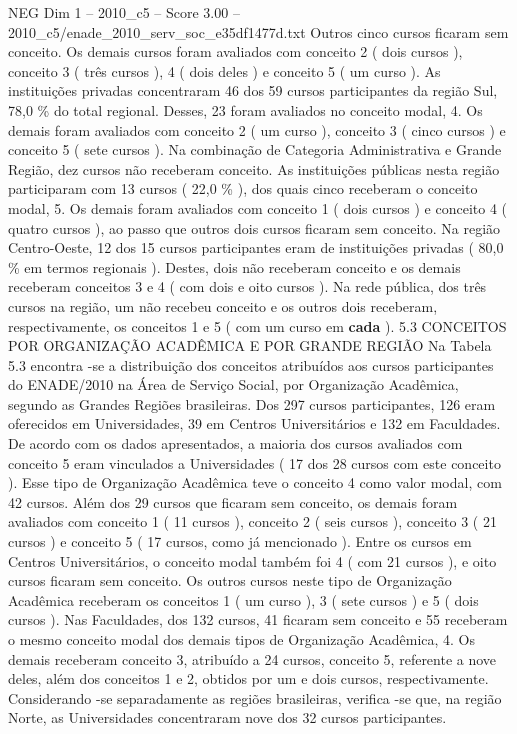 \begin{textsample}{NEG Dim 1 – 2010\_c5 – Score 3.00 – 2010\_c5/enade\_2010\_serv\_soc\_e35df1477d.txt}
Outros cinco cursos ficaram sem conceito.
Os demais cursos foram avaliados com conceito 2 ( dois cursos ), conceito 3 ( três cursos ), 4 ( dois deles ) e conceito 5 ( um curso ).
As instituições privadas concentraram 46 dos 59 cursos participantes da região Sul, 78,0 \% do total regional.
Desses, 23 foram avaliados no conceito modal, 4.
Os demais foram avaliados com conceito 2 ( um curso ), conceito 3 ( cinco cursos ) e conceito 5 ( sete cursos ).
Na combinação de Categoria Administrativa e Grande Região, dez cursos não receberam conceito.
As instituições públicas nesta região participaram com 13 cursos ( 22,0 \% ), dos quais cinco receberam o conceito modal, 5.
Os demais foram avaliados com conceito 1 ( dois cursos ) e conceito 4 ( quatro cursos ), ao passo que outros dois cursos ficaram sem conceito.
Na região Centro-Oeste, 12 dos 15 cursos participantes eram de instituições privadas ( 80,0 \% em termos regionais ).
Destes, dois não receberam conceito e os demais receberam conceitos 3 e 4 ( com dois e oito cursos ).
Na rede pública, dos três cursos na região, um não recebeu conceito e os outros dois receberam, respectivamente, os conceitos 1 e 5 ( com um curso em \textbf{cada} ). 5.3 CONCEITOS POR ORGANIZAÇÃO ACADÊMICA E POR GRANDE REGIÃO Na Tabela 5.3 encontra -se a distribuição dos conceitos atribuídos aos cursos participantes do ENADE/2010 na Área de Serviço Social, por Organização Acadêmica, segundo as Grandes Regiões brasileiras.
Dos 297 cursos participantes, 126 eram oferecidos em Universidades, 39 em Centros Universitários e 132 em Faculdades.
De acordo com os dados apresentados, a maioria dos cursos avaliados com conceito 5 eram vinculados a Universidades ( 17 dos 28 cursos com este conceito ).
Esse tipo de Organização Acadêmica teve o conceito 4 como valor modal, com 42 cursos.
Além dos 29 cursos que ficaram sem conceito, os demais foram avaliados com conceito 1 ( 11 cursos ), conceito 2 ( seis cursos ), conceito 3 ( 21 cursos ) e conceito 5 ( 17 cursos, como já mencionado ).
Entre os cursos em Centros Universitários, o conceito modal também foi 4 ( com 21 cursos ), e oito cursos ficaram sem conceito.
Os outros cursos neste tipo de Organização Acadêmica receberam os conceitos 1 ( um curso ), 3 ( sete cursos ) e 5 ( dois cursos ).
Nas Faculdades, dos 132 cursos, 41 ficaram sem conceito e 55 receberam o mesmo conceito modal dos demais tipos de Organização Acadêmica, 4.
Os demais receberam conceito 3, atribuído a 24 cursos, conceito 5, referente a nove deles, além dos conceitos 1 e 2, obtidos por um e dois cursos, respectivamente.
Considerando -se separadamente as regiões brasileiras, verifica -se que, na região Norte, as Universidades concentraram nove dos 32 cursos participantes.

\end{textsample}

